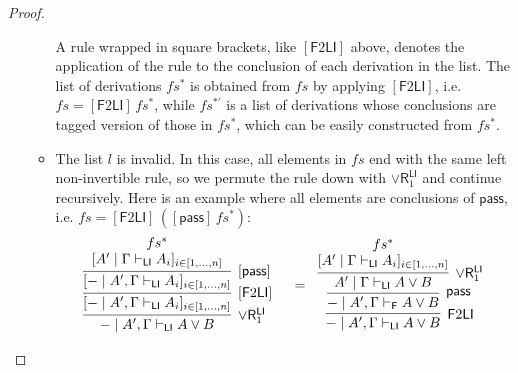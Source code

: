 \documentclass[submission,copyright,creativecommons]{eptcs}
\theoremstyle{definition}
\newcommand{\pass}{\mathsf{pass}}
\newcommand{\andlone}{\land \mathsf{L}_{1}}
\newcommand{\orrone}{\lor \mathsf{R}_{1}}
\newcommand{\LI}{\mathsf{LI}}
\newcommand{\F}{\mathsf{F}}
\newcommand{\tL}{\mathbb{L}}
\newcommand{\proofbox}[1]{\begin{tabular}{l} #1 \end{tabular}}
\begin{document}
\begin{proof}
\begin{itemize}
\begin{itemize}
      A rule wrapped in square brackets, like $[\F 2 \LI]$ above, denotes the application of the rule to the conclusion of each derivation in the list.
      The list of derivations $fs^{*}$ is obtained from $fs$ by applying $[\F 2 \LI]$, i.e. $fs = [\F 2 \LI]\,fs^*$, while $fs^{*'}$ is a list of derivations whose conclusions are tagged version of those in $fs^{*}$, which can be easily constructed from $fs^{*}$.
      \item The list $l$ is invalid. In this case, all elements in $fs$ end with the same left non-invertible rule, so we permute the rule down with $\orrone^{\LI}$ and continue recursively.
      Here is an example where all elements are conclusions of $\pass$, i.e. $fs = [\F 2 \LI] \,([\pass]\,fs^*)$:
      \begin{displaymath}
        \begin{array}{cc}
          \proofbox{
            \infer[\orrone^{\LI}]{- \mid A' , \Gamma \vdash_{\LI} A \lor B}{
              \infer[ {[\F 2 \LI]} ]{[- \mid A' , \Gamma \vdash_{\LI} A_i]_{i \in [1 , \dots , n]}}{
                \infer[ {[\pass]} ]{[- \mid A' , \Gamma \vdash_{\LI} A_i]_{i \in [1 , \dots , n]}}{
                  \deduce{[A' \mid \Gamma \vdash_{\LI} A_i]_{i \in [1 , \dots , n]}}{fs^{*}}
                }
              }
            }
          }
          &
          =
          \proofbox{
            \infer[\F 2 \LI]{- \mid A' , \Gamma \vdash_{\LI} A \lor B}{
              \infer[\pass]{- \mid A' , \Gamma \vdash_{\F} A \lor B}{
                \infer[\orrone^{\LI}]{A' \mid \Gamma \vdash_{\LI} A \lor B}{
                  \deduce{[A' \mid \Gamma \vdash_{\LI} A_i]_{i \in [1 , \dots , n]}}{fs^{*}}
                }
}}}
\end{array}
\end{displaymath}
\end{itemize}
\end{itemize}
\end{proof}
\end{document}
